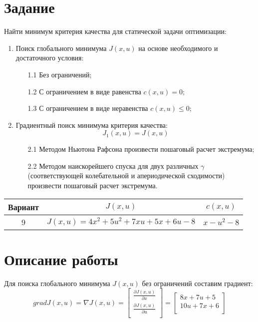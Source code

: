 \documentclass[14pt, a4paper]{extarticle}
\begin{document}
	\onehalfspacing
	
	\setcounter{page}{2}
	
	\section*{Задание}
	
	Найти минимум критерия качества для статической задачи оптимизации:
	\begin{enumerate}
		\item Поиск глобального минимума $J(x,u)$ на основе необходимого и достаточного условия:
		\begin{enumerate}
			\item[1.1] Без ограничений;
			\item[1.2] С ограничением в виде равенства $c(x,u)=0$;
			\item[1.3] С ограничением в виде неравенства $c(x,u)\le0$; 
		\end{enumerate}
		\item Градиентный поиск минимума критерия качества:
		$$J_1(x,u)=J(x,u)$$
		\begin{enumerate}
			\item[2.1] Методом Ньютона Рафсона произвести пошаговый расчет экстремума;
			\item[2.2] Методом наискорейшего спуска для двух различных $\gamma$ (соответствующей колебательной и апериодической сходимости) произвести пошаговый расчет экстремума. 
		\end{enumerate}
	\end{enumerate}
	\begin{table}[H]
		\centering
		\begin{tabular}{|c|c|c|}
			\hline
			Вариант & $J(x,u)$ & $c(x,u)$ \\\hline
			9 & $J(x,u)=4x^2+5u^2+7xu+5x+6u-8$ & $x-u^2-8$ \\\hline
		\end{tabular}
	\end{table}
	
	\newpage
	
	\section*{Описание работы}
	
	Для поиска глобального минимума $J(x,u)$ без ограничений составим градиент:
	$$gradJ(x,u)=\nabla J(x,u)=\left[\begin{matrix}
		\frac{\partial J(x,u)}{\partial x} \\
		\frac{\partial J(x,u)}{\partial u} \\
	\end{matrix}\right]=\left[\begin{matrix}
		8x+7u+5 \\
		10u+7x+6 \\
	\end{matrix}\right]$$
	
\end{document}
